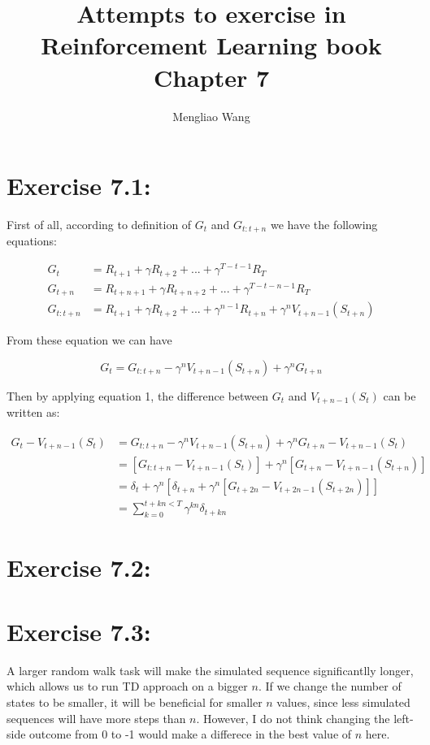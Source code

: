 \documentclass[10pt,letterpaper]{article}
\title{Attempts to exercise in Reinforcement Learning book Chapter 7}
\author{Mengliao Wang}
\begin{document}
\maketitle



\section*{Exercise 7.1: }
\label{7.1}

First of all, according to definition of $G_t$ and $G_{t:t+n}$ we have the following equations:

\begin{align*}
G_t &= R_{t+1} + \gamma R_{t+2} + ... + \gamma^{T-t-1}R_T\\
G_{t+n} &= R_{t+n+1} + \gamma R_{t+n+2} + ... + \gamma^{T-t-n-1}R_T\\
G_{t:t+n} &= R_{t+1} + \gamma R_{t+2} + ... + \gamma^{n-1}R_{t+n} + \gamma^nV_{t+n-1}(S_{t+n})
\end{align*}

From these equation we can have 

\begin{equation}
G_t = G_{t:t+n} -\gamma^nV_{t+n-1}(S_{t+n}) + \gamma^nG_{t+n}
\end{equation}

Then by applying equation 1, the difference between $G_t$ and $V_{t+n-1}(S_t)$ can be written as:

\begin{align}
G_t - V_{t+n-1}(S_t) &= G_{t:t+n} -\gamma^nV_{t+n-1}(S_{t+n}) + \gamma^nG_{t+n} - V_{t+n-1}(S_t) \\
&= [G_{t:t+n} - V_{t+n-1}(S_t)] + \gamma^n[G_{t+n} - V_{t+n-1}(S_{t+n})]\\
&= \delta_t + \gamma^n[\delta_{t+n} + \gamma^n[G_{t+2n} - V_{t+2n-1}(S_{t+2n})]]\\
&= \sum_{k=0}^{t+kn<T}\gamma^{kn}\delta_{t+kn}
\end{align}


\section*{Exercise 7.2: }
\label{7.2}


\section*{Exercise 7.3: }
\label{7.3}

A larger random walk task will make the simulated sequence significantlly longer, which allows us to run TD approach on a bigger $n$. If we change the number of states to be smaller, it will be beneficial for smaller $n$ values, since less simulated sequences will have more steps than $n$. However, I do not think changing the left-side outcome from 0 to -1 would make a differece in the best value of $n$ here.

\clearpage
\end{document}
